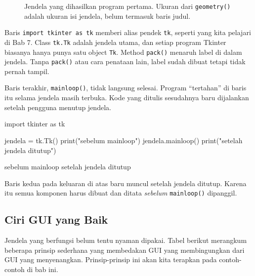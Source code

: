 \begin{figure}[htbp]
\centering
{}
\caption{Jendela yang dihasilkan program pertama. Ukuran dari \texttt{geometry()} adalah ukuran isi jendela, belum termasuk baris judul.}
\end{figure}

Baris \texttt{import tkinter as tk} memberi alias pendek \texttt{tk}, seperti yang kita pelajari di Bab 7. Class \texttt{tk.Tk} adalah jendela utama, dan setiap program Tkinter biasanya hanya punya satu object \texttt{Tk}. Method \texttt{pack()} menaruh label di dalam jendela. Tanpa \texttt{pack()} atau cara penataan lain, label sudah dibuat tetapi tidak pernah tampil.

Baris terakhir, \texttt{mainloop()}, tidak langsung selesai. Program ``tertahan'' di baris itu selama jendela masih terbuka. Kode yang ditulis sesudahnya baru dijalankan setelah pengguna menutup jendela.

\begin{kode}
import tkinter as tk

jendela = tk.Tk()
print("sebelum mainloop")
jendela.mainloop()
print("setelah jendela ditutup")
\end{kode}

\begin{keluaran}
sebelum mainloop
setelah jendela ditutup
\end{keluaran}

Baris kedua pada keluaran di atas baru muncul setelah jendela ditutup. Karena itu semua komponen harus dibuat dan ditata \emph{sebelum} \texttt{mainloop()} dipanggil.

\subsection{Ciri GUI yang Baik}

Jendela yang berfungsi belum tentu nyaman dipakai. Tabel berikut merangkum beberapa prinsip sederhana yang membedakan GUI yang membingungkan dari GUI yang menyenangkan. Prinsip-prinsip ini akan kita terapkan pada contoh-contoh di bab ini.

